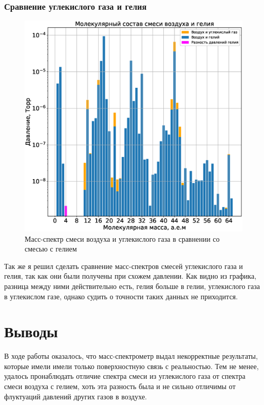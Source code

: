 \documentclass[a4paper,14pt]{extarticle}
\begin{document}
			\subsubsection{Сравнение углекислого газа и гелия}
				\begin{figure}[h!]
					\centering
					\includegraphics[width=.75\linewidth]{Lab2_4.eps}
					\caption{Масс-спектр смеси воздуха и углекислого газа в сравнении со смесью с гелием}
					\label{fig7}
				\end{figure}
				Так же я решил сделать сравнение масс-спектров смесей углекислого газа и гелия, так как они были получены при схожем давлении. Как видно из графика, разница между ними действительно есть, гелия больше в гелии, углекислого газа в углекислом газе, однако судить о точности таких данных не приходится.
	\section{Выводы}
		В ходе работы оказалось, что масс-спектрометр выдал некорректные результаты, которые имели имели только поверхностную связь с реальностью. Тем не менее, удалось пронаблюдать отличие спектра смеси из углекислого газа от спектра смеси воздуха с гелием, хоть эта разность была и не сильно отличимы от флуктуаций давлений других газов в воздухе.
\end{document}
